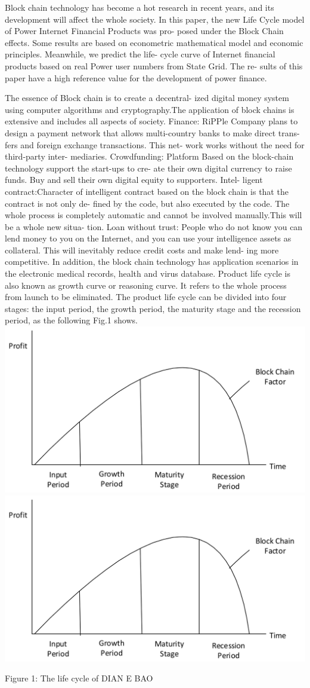 \documentclass[11pt]{article}
\begin{document}
\begin{multicols}{2}
	Block chain technology has become a hot research
	in recent years, and its development will affect the
	whole society. In this paper, the new Life Cycle
	model of Power Internet Financial Products was pro-
	posed under the Block Chain effects. Some results
	are based on econometric mathematical model and
	economic principles. Meanwhile, we predict the life-
	cycle curve of Internet financial products based on
	real Power user numbers from State Grid. The re-
	sults of this paper have a high reference value for the
	development of power finance.
	
	The essence of Block chain is to create a decentral-
	ized digital money system using computer algorithms
	and cryptography.The application of block chains is
	extensive and includes all aspects of society. Finance:
	RiPPle Company plans to design a payment network
	that allows multi-country banks to make direct trans-
	fers and foreign exchange transactions. This net-
	work works without the need for third-party inter-
	mediaries. Crowdfunding: Platform Based on the
	block-chain technology support the start-ups to cre-
	ate their own digital currency to raise funds. Buy
	and sell their own digital equity to supporters. Intel-
	ligent contract:Character of intelligent contract based
	on the block chain is that the contract is not only de-
	fined by the code, but also executed by the code. The
	whole process is completely automatic and cannot be
	involved manually.This will be a whole new situa-
	tion. Loan without trust: People who do not know
	you can lend money to you on the Internet, and you
	can use your intelligence assets as collateral. This
	will inevitably reduce credit costs and make lend-
	ing more competitive. In addition, the block chain
	technology has application scenarios in the electronic
	medical records, health and virus database.
	Product life cycle is also known as growth curve
	or reasoning curve. It refers to the whole process
	from launch to be eliminated. The product life cycle
	can be divided into four stages: the input period, the
	growth period, the maturity stage and the recession
	period, as the following Fig.1 shows.
	\includegraphics[width=0.45\linewidth]{block_chain.png}
	\includegraphics[width=0.45\linewidth]{block_chain.png}\\ \begin{center}
	Figure 1: The life cycle of DIAN E BAO\end{center}


\end{multicols}
\end{document}
